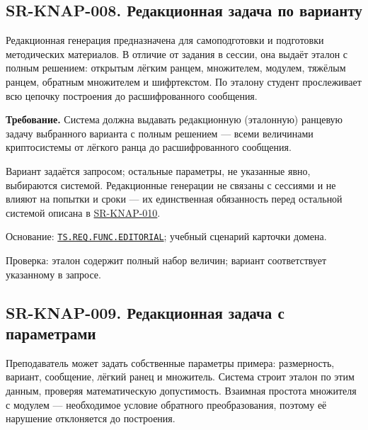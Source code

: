 \documentclass[12pt,a4paper]{article}
\begin{document}
\subsection{SR-KNAP-008. Редакционная задача по варианту}\label{sr-knap-008-ux440ux435ux434ux430ux43aux446ux438ux43eux43dux43dux430ux44f-ux437ux430ux434ux430ux447ux430-ux43fux43e-ux432ux430ux440ux438ux430ux43dux442ux443}

\hypertarget{sr-knap-008-редакционная-задача-по-варианту}{}

\hypertarget{sr-knap-008}{}

Редакционная генерация предназначена для самоподготовки и подготовки методических материалов. В отличие от задания в сессии, она выдаёт эталон с полным решением: открытым лёгким ранцем, множителем, модулем, тяжёлым ранцем, обратным множителем и шифртекстом. По эталону студент прослеживает всю цепочку построения до расшифрованного сообщения.

\textbf{Требование.} Система должна выдавать редакционную (эталонную) ранцевую задачу выбранного варианта с полным решением --- всеми величинами криптосистемы от лёгкого ранца до расшифрованного сообщения.

Вариант задаётся запросом; остальные параметры, не указанные явно, выбираются системой. Редакционные генерации не связаны с сессиями и не влияют на попытки и сроки --- их единственная обязанность перед остальной системой описана в {\hyperlink{sr-knap-010}{SR-KNAP-010}}.

Основание: {\href{../02\_Техническое\_задание/Техническое\_задание.pdf\#ts-req-func-editorial}{\texttt{TS.\allowbreak{}REQ.\allowbreak{}FUNC.\allowbreak{}EDITORIAL}}}; учебный сценарий карточки домена.

Проверка: эталон содержит полный набор величин; вариант соответствует указанному в запросе.

\subsection{SR-KNAP-009. Редакционная задача с параметрами}\label{sr-knap-009-ux440ux435ux434ux430ux43aux446ux438ux43eux43dux43dux430ux44f-ux437ux430ux434ux430ux447ux430-ux441-ux43fux430ux440ux430ux43cux435ux442ux440ux430ux43cux438}

\hypertarget{sr-knap-009-редакционная-задача-с-параметрами}{}

\hypertarget{sr-knap-009}{}

Преподаватель может задать собственные параметры примера: размерность, вариант, сообщение, лёгкий ранец и множитель. Система строит эталон по этим данным, проверяя математическую допустимость. Взаимная простота множителя с модулем --- необходимое условие обратного преобразования, поэтому её нарушение отклоняется до построения.
\end{document}

